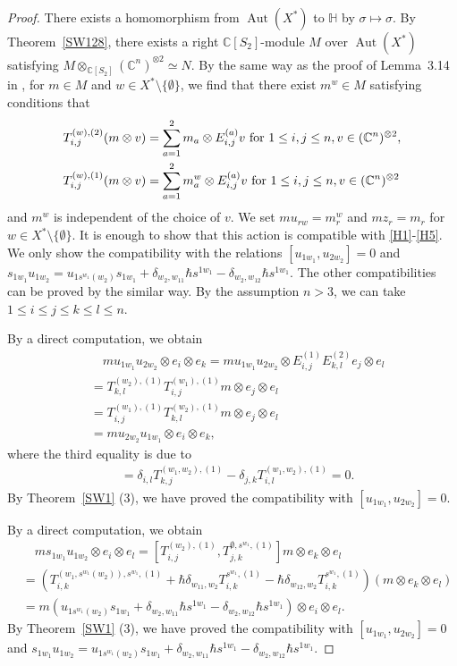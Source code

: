\documentclass{article}
\theoremstyle{definition}
\theoremstyle{remark}
\numberwithin{equation}{section}
\DeclareMathOperator{\Aut}{Aut}
\numberwithin{equation}{section}
\begin{document}
\begin{proof}
There exists a homomorphism from $\Aut(X^*)$ to $\mathbb{H}$ by $\sigma\mapsto \sigma$.
By Theorem~\ref{SW128}, there exists a right $\mathbb{C}[S_2]$-module $M$ over $\Aut(X^*)$ satisfying $M\otimes_{\mathbb{C}[S_2]}(\mathbb{C}^n)^{\otimes2}\simeq N$. By the same way as the proof of Lemma~3.14 in \cite{GJU}, for $m\in M$ and $w\in X^*\setminus\{\emptyset\}$, we find that there exist $m^{w}\in M$ satisfying conditions that
\begin{align*}
T^{(w),(2)}_{i,j}(m\otimes v)&=\sum_{a=1}^2\limits m_a\otimes E^{(a)}_{i,j}v\text{ for }1\leq i,j\leq n,v\in(\mathbb{C}^n)^{\otimes2},\\
T^{(w),(1)}_{i,j}(m\otimes v)&=\sum_{a=1}^2\limits m^{w}_a\otimes E^{(a)}_{i,j}v\text{ for }1\leq i,j\leq n,v\in(\mathbb{C}^n)^{\otimes2}
\end{align*}
and $m^w$ is independent of the choice of $v$. We set $mu_{rw}=m^{w}_r$ and $mz_r=m_r$ for $w\in X^*\setminus\{\emptyset\}$. It is enough to show that this action is compatible with \eqref{H1}-\eqref{H5}.
We only show the compatibility with the relations $[u_{1w_1},u_{2w_2}]=0$ and $s_{1w_1}u_{1w_2}=u_{1s^{w_1}(w_2)}s_{1w_1}+\delta_{w_2,w_11}\hbar s^{1w_1}-\delta_{w_2,w_12}\hbar s^{1w_1}$. The other compatibilities can be proved by the similar way. By the assumption $n>3$, we can take $1\leq i\leq j\leq k\leq l\leq n$.

By a direct computation, we obtain
\begin{align*}
&\quad mu_{1w_1}u_{2w_2}\otimes e_i\otimes e_k=mu_{1w_1}u_{2w_2}\otimes E^{(1)}_{i,j}E^{(2)}_{k,l}e_j\otimes e_l\\
&=T^{(w_2),(1)}_{k,l}T^{(w_1),(1)}_{i,j}m\otimes e_j\otimes e_l\\
&=T^{(w_1),(1)}_{i,j}T^{(w_2),(1)}_{k,l}m\otimes e_j\otimes e_l\\
&=mu_{2w_2}u_{1w_1}\otimes e_i\otimes e_k,
\end{align*}
where the third equality is due to
\begin{align*}
[T^{(w_2),(1)}_{k,l},T^{(w_1),(1)}_{i,j}]&=\delta_{i,l}T^{(w_1,w_2),(1)}_{k,j}-\delta_{j,k}T^{(w_1,w_2),(1)}_{i,l}=0.
\end{align*}
By Theorem~\ref{SW1} (3), we have proved the compatibility with $[u_{1w_1},u_{2w_2}]=0$.

By a direct computation, we obtain
\begin{align*}
&\quad ms_{1w_1}u_{1w_2}\otimes e_i\otimes e_l=[T^{(w_2),(1)}_{i,j},T^{\emptyset,s^{w_1},(1)}_{j,k}]m\otimes e_k\otimes e_l\\
&=(T^{(w_1,s^{w_1}(w_2)),s^{w_1},(1)}_{i,k}+\hbar\delta_{w_11,w_2}T^{s^{w_1},(1)}_{i,k}-\hbar\delta_{w_12,w_2}T^{s^{w_1},(1)}_{i,k})(m\otimes e_k\otimes e_l)\\
&=m(u_{1s^{w_1}(w_2)}s_{1w_1}+\delta_{w_2,w_11}\hbar s^{1w_1}-\delta_{w_2,w_12}\hbar s^{1w_1})\otimes e_i\otimes e_l.
\end{align*}
By Theorem~\ref{SW1} (3), we have proved the compatibility with $[u_{1w_1},u_{2w_2}]=0$ and $s_{1w_1}u_{1w_2}=u_{1s^{w_1}(w_2)}s_{1w_1}+\delta_{w_2,w_11}\hbar s^{1w_1}-\delta_{w_2,w_12}\hbar s^{1w_1}$.
\end{proof}
\end{document}
